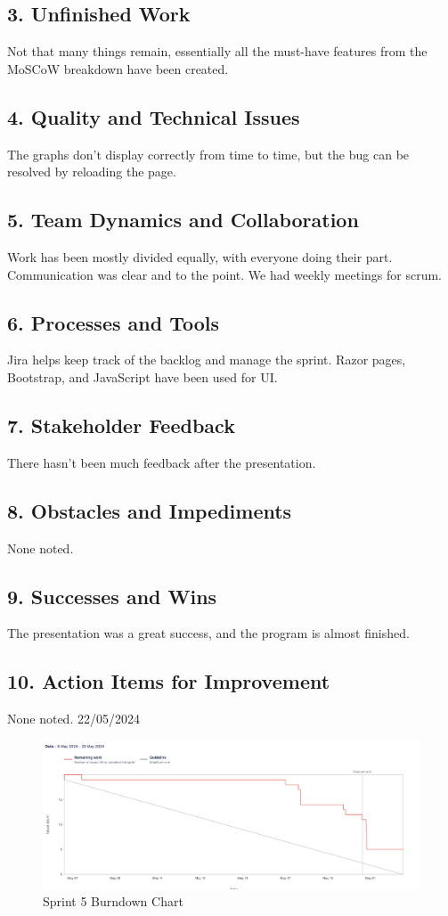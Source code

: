 \documentclass[12pt]{report}
\begin{document}
\subsection*{3. Unfinished Work}
Not that many things remain, essentially all the must-have features from the MoSCoW breakdown have been created.
\subsection*{4. Quality and Technical Issues}
The graphs don't display correctly from time to time, but the bug can be resolved by reloading the page.
\subsection*{5. Team Dynamics and Collaboration}
Work has been mostly divided equally, with everyone doing their part. Communication was clear and to the point. We had weekly meetings for scrum.
\subsection*{6. Processes and Tools}
Jira helps keep track of the backlog and manage the sprint. Razor pages, Bootstrap, and JavaScript have been used for UI.
\subsection*{7. Stakeholder Feedback}
There hasn’t been much feedback after the presentation.
\subsection*{8. Obstacles and Impediments}
None noted.
\subsection*{9. Successes and Wins}
The presentation was a great success, and the program is almost finished.
\subsection*{10. Action Items for Improvement}
None noted.
\hfill 22/05/2024

\begin{figure}[H]
  \centering
  \includegraphics[width=1\textwidth]{Resources/5-Sprint/Review/Burndown.png}
  \caption{Sprint 5 Burndown Chart}
  \label{fig:S5Burndown}
\end{figure}
\end{document}

